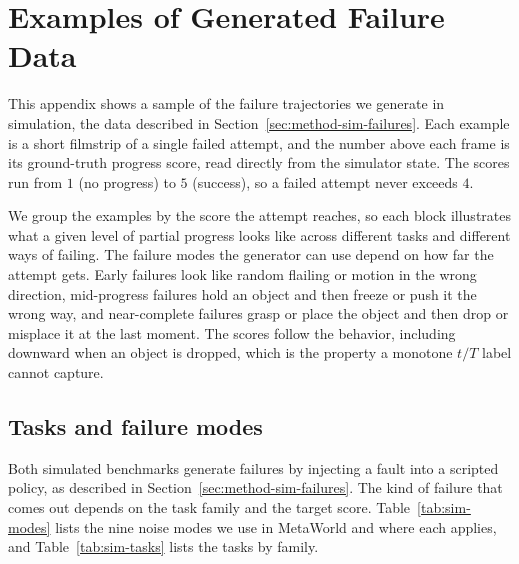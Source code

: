 \chapter{Examples of Generated Failure Data}
\label{apx:gallery}

This appendix shows a sample of the failure trajectories we generate in simulation, the data described in Section~\ref{sec:method-sim-failures}. Each example is a short filmstrip of a single failed attempt, and the number above each frame is its ground-truth progress score, read directly from the simulator state. The scores run from $1$ (no progress) to $5$ (success), so a failed attempt never exceeds $4$.

We group the examples by the score the attempt reaches, so each block illustrates what a given level of partial progress looks like across different tasks and different ways of failing. The failure modes the generator can use depend on how far the attempt gets. Early failures look like random flailing or motion in the wrong direction, mid-progress failures hold an object and then freeze or push it the wrong way, and near-complete failures grasp or place the object and then drop or misplace it at the last moment. The scores follow the behavior, including downward when an object is dropped, which is the property a monotone $t/T$ label cannot capture.

\section{Tasks and failure modes}

Both simulated benchmarks generate failures by injecting a fault into a scripted policy, as described in Section~\ref{sec:method-sim-failures}. The kind of failure that comes out depends on the task family and the target score. Table~\ref{tab:sim-modes} lists the nine noise modes we use in MetaWorld \citep{yu_meta-world_2019} and where each applies, and Table~\ref{tab:sim-tasks} lists the tasks by family.

